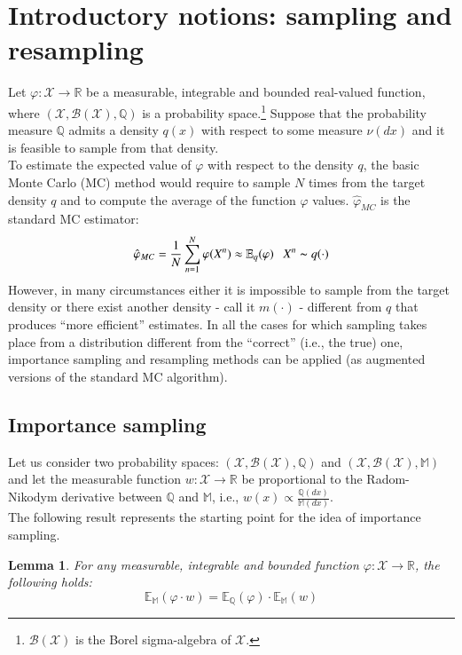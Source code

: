 \documentclass[
]{book}
\theoremstyle{break}
\newtheorem{lemma}{Lemma}
\theoremstyle{nonumberplain}
\begin{document}
\section{Introductory notions: sampling and resampling}\label{pf_intro}

Let \(\varphi: \mathcal X\rightarrow \mathbb R\) be a measurable,
integrable and bounded real-valued function, where
\((\mathcal X,\mathcal B(\mathcal X),\mathbb Q)\) is a probability
space.\footnote{$\mathcal B(\mathcal X)$ is the Borel sigma-algebra of $\mathcal X$.}
Suppose that the probability measure \(\mathbb Q\) admits a density
\(q(x)\) with respect to some measure \(\nu(dx)\) and it is feasible to
sample from that density.\\
To estimate the expected value of \(\varphi\) with respect to the
density \(q\), the basic Monte Carlo (MC) method would require to sample
\(N\) times from the target density \(q\) and to compute the average of
the function \(\varphi\) values. \(\hat \varphi_{MC}\) is the standard
MC estimator: \begin{equation*}
   \hat \varphi_{MC}=\frac{1}{N} \sum_{n=1}^N\varphi (X^n)\approx \mathbb E_q(\varphi)~~~X^n\thicksim q(\cdot)
\end{equation*} However, in many circumstances either it is impossible
to sample from the target density or there exist another density - call
it \(m(\cdot)\) - different from \(q\) that produces ``more efficient''
estimates. In all the cases for which sampling takes place from a
distribution different from the ``correct'' (i.e., the true) one,
importance sampling and resampling methods can be applied (as augmented
versions of the standard MC algorithm).

\subsection{Importance sampling}

Let us consider two probability spaces:
\((\mathcal X,\mathcal B(\mathcal X),\mathbb Q)\) and
\((\mathcal X,\mathcal B(\mathcal X),\mathbb M)\) and let the measurable
function \(w:\mathcal X\rightarrow \mathbb R\) be proportional to the
Radom-Nikodym derivative between \(\mathbb Q\) and \(\mathbb M\), i.e.,
\(w(x)\propto\frac{\mathbb Q(dx)}{\mathbb M(dx)}\).\\
The following result represents the starting point for the idea of
importance sampling. \bigskip

\begin{lemma}\label{lemma_imp_sam_1}
For any measurable, integrable and bounded function $\varphi: \mathcal X\rightarrow \mathbb R$, the following holds:
\begin{equation}
    \mathbb E_\mathbb M(\varphi \cdot w)=\mathbb E_\mathbb Q(\varphi)\cdot \mathbb E_\mathbb M(w)
\end{equation}
\end{lemma}
\end{document}
